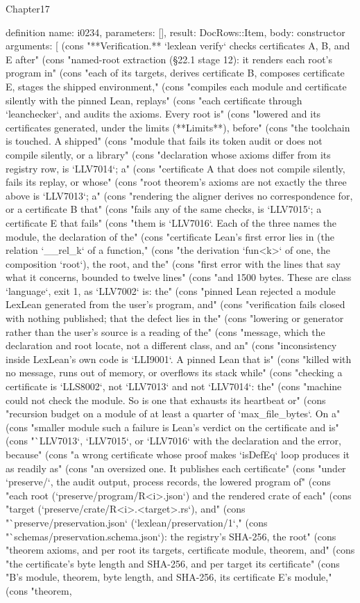 \begin{lexlean}{Chapter17}
\begin{semanticmodule}
definition{
  name: i0234,
  parameters: [],
  result: DocRows::Item,
  body: constructor{
    arguments: [
      (cons "**Verification.** `lexlean verify` checks certificates A, B, and E after" (cons "named-root extraction (§22.1 stage 12): it renders each root's program in" (cons "each of its targets, derives certificate B, composes certificate E, stages the shipped environment," (cons "compiles each module and certificate silently with the pinned Lean, replays" (cons "each certificate through `leanchecker`, and audits the axioms. Every root is" (cons "lowered and its certificates generated, under the limits (**Limits**), before" (cons "the toolchain is touched. A shipped" (cons "module that fails its token audit or does not compile silently, or a library" (cons "declaration whose axioms differ from its registry row, is `LLV7014`; a" (cons "certificate A that does not compile silently, fails its replay, or whose" (cons "root theorem's axioms are not exactly the three above is `LLV7013`; a" (cons "rendering the aligner derives no correspondence for, or a certificate B that" (cons "fails any of the same checks, is `LLV7015`; a certificate E that fails" (cons "them is `LLV7016`. Each of the three names the module, the declaration of the" (cons "certificate Lean's first error lies in (the relation `__rel_k` of a function," (cons "the derivation `fun<k>` of one, the composition `root`), the root, and the" (cons "first error with the lines that say what it concerns, bounded to twelve lines" (cons "and 1500 bytes. These are class `language`, exit 1, as `LLV7002` is: the" (cons "pinned Lean rejected a module LexLean generated from the user's program, and" (cons "verification fails closed with nothing published; that the defect lies in the" (cons "lowering or generator rather than the user's source is a reading of the" (cons "message, which the declaration and root locate, not a different class, and an" (cons "inconsistency inside LexLean's own code is `LLI9001`. A pinned Lean that is" (cons "killed with no message, runs out of memory, or overflows its stack while" (cons "checking a certificate is `LLS8002`, not `LLV7013` and not `LLV7014`: the" (cons "machine could not check the module. So is one that exhausts its heartbeat or" (cons "recursion budget on a module of at least a quarter of `max_file_bytes`. On a" (cons "smaller module such a failure is Lean's verdict on the certificate and is" (cons "`LLV7013`, `LLV7015`, or `LLV7016` with the declaration and the error, because" (cons "a wrong certificate whose proof makes `isDefEq` loop produces it as readily as" (cons "an oversized one. It publishes each certificate" (cons "under `preserve/`, the audit output, process records, the lowered program of" (cons "each root (`preserve/program/R<i>.json`) and the rendered crate of each" (cons "target (`preserve/crate/R<i>.<target>.rs`), and" (cons "`preserve/preservation.json` (`lexlean/preservation/1`," (cons "`schemas/preservation.schema.json`): the registry's SHA-256, the root" (cons "theorem axioms, and per root its targets, certificate module, theorem, and" (cons "the certificate's byte length and SHA-256, and per target its certificate" (cons "B's module, theorem, byte length, and SHA-256, its certificate E's module," (cons "theorem, }}
\end{semanticmodule}
\end{lexlean}
